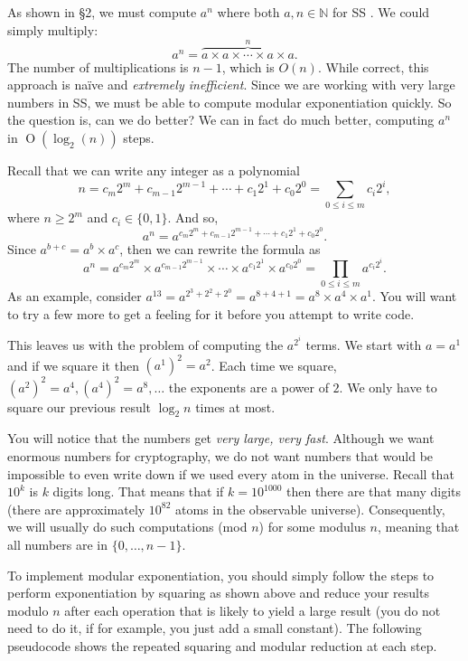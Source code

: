 As shown in \S2, we must compute $a^n$ where both $a, n \in \mathbb{N}$
for SS . We could simply multiply:
\[
  a^n = \overbrace{a \times a \times \cdots \times a \times a}^n .
\]
The number of multiplications is $n-1$,
which is ${O}(n)$. While correct, this approach is na{\"{i}}ve and
\emph{extremely inefficient}. Since we are working with very large
numbers in SS, we must be able to compute modular exponentiation
quickly. So the question is, can we do better? We can in fact do much
better, computing $a^n$ in $\operatorname{O}(\log_2(n))$ steps.

Recall that we can write any integer as a polynomial
\[
  n = c_m 2^m + c_{m-1} 2^{m-1} + \cdots + c_1 2^1 + c_0 2^0 =
  \sum_{0\le i \le m} c_i 2^i ,
\]
where $n \ge 2^m$ and $c_i \in \{0, 1\}$. And so,
\[
  a^n = a^{c_m 2^m + c_{m-1} 2^{m-1} + \cdots + c_1 2^1 + c_0 2^0} .
\]
Since $a^{b+c} = a^b \times a^c$, then we can rewrite the formula as
\[
  a^n = a^{c_m 2^m} \times a^{c_{m-1} 2^{m-1}} \times \cdots \times
  a^{c_1 2^1} \times a^{c_0 2^0} = \prod_{0\le i \le m} a^{c_i 2^i} .
\]
As an example, consider $a^{13} = a^{2^3 + 2^2 + 2^0} = a^{8 + 4 + 1} =
a^8 \times a^4 \times a^1$. You will want to try a few more to get a
feeling for it before you attempt to write code.

This leaves us with the problem of computing the $a^{2^i}$ terms. We
start with $a = a^1$ and if we square it then $(a^1)^2 = a^2$. Each
time we square, $(a^2)^2 = a^4, (a^4)^2 = a^8, \ldots$ the exponents
are a power of $2$. We only have to square our previous result $\log_2
n$ times at most.

You will notice that the numbers get \emph{very large, very fast}.
Although we want enormous numbers for cryptography, we do not want
numbers that would be impossible to even write down if we used every
atom in the universe. Recall that $10^k$ is $k$ digits long. That
means that if $k=10^{1000}$ then there are that many digits (there are
approximately $10^{82}$ atoms in the observable universe).
Consequently, we will usually do such computations (mod ${n}$) for
some modulus $n$, meaning that all numbers are in $\{0, \ldots,
n-1\}$.

To implement modular exponentiation, you should simply follow the
steps to perform exponentiation by squaring as shown above and
reduce your results modulo $n$ after each operation that is likely to
yield a large result (you do not need to do it, if for example, you
just add a small constant). The following pseudocode shows the
repeated squaring and modular reduction at each step.

